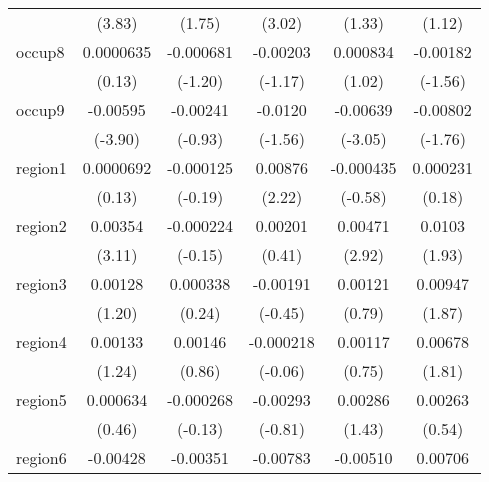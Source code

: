 \begin{table}[htbp]
\begin{tabular}{l*{5}{c}}
            &      (3.83)         &      (1.75)         &      (3.02)         &      (1.33)         &      (1.12)         \\
occup8      &   0.0000635         &   -0.000681         &    -0.00203         &    0.000834         &    -0.00182         \\
            &      (0.13)         &     (-1.20)         &     (-1.17)         &      (1.02)         &     (-1.56)         \\
occup9      &    -0.00595\sym{***}&    -0.00241         &     -0.0120         &    -0.00639\sym{**} &    -0.00802         \\
            &     (-3.90)         &     (-0.93)         &     (-1.56)         &     (-3.05)         &     (-1.76)         \\
region1     &   0.0000692         &   -0.000125         &     0.00876\sym{*}  &   -0.000435         &    0.000231         \\
            &      (0.13)         &     (-0.19)         &      (2.22)         &     (-0.58)         &      (0.18)         \\
region2     &     0.00354\sym{**} &   -0.000224         &     0.00201         &     0.00471\sym{**} &      0.0103         \\
            &      (3.11)         &     (-0.15)         &      (0.41)         &      (2.92)         &      (1.93)         \\
region3     &     0.00128         &    0.000338         &    -0.00191         &     0.00121         &     0.00947         \\
            &      (1.20)         &      (0.24)         &     (-0.45)         &      (0.79)         &      (1.87)         \\
region4     &     0.00133         &     0.00146         &   -0.000218         &     0.00117         &     0.00678         \\
            &      (1.24)         &      (0.86)         &     (-0.06)         &      (0.75)         &      (1.81)         \\
region5     &    0.000634         &   -0.000268         &    -0.00293         &     0.00286         &     0.00263         \\
            &      (0.46)         &     (-0.13)         &     (-0.81)         &      (1.43)         &      (0.54)         \\
region6     &    -0.00428\sym{***}&    -0.00351         &    -0.00783         &    -0.00510\sym{***}&     0.00706         \\

\end{tabular}
\end{table}
